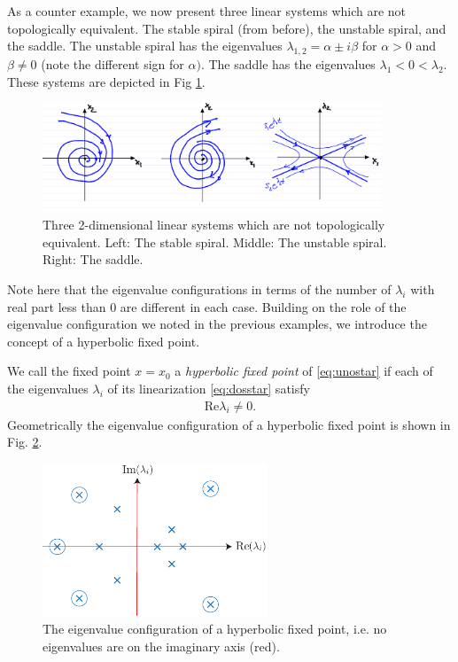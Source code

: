 \begin{ex}[Topologically inequivalent linear systems for $n=2$]
	As a counter example, we now present three linear systems which are not topologically equivalent. The stable spiral (from before), the unstable spiral, and the saddle. The unstable spiral has the eigenvalues $\lambda _{1,2}= \alpha \pm i \beta $ for $\alpha > 0$ and $\beta \neq 0$ (note the different sign for $\alpha)$. The saddle has the eigenvalues $\lambda _1 < 0 < \lambda_2$. These systems are depicted in Fig \ref{fig:topo_inequiv}.
	\begin{figure}[h!]
		\centering
		\includegraphics[width=0.9\textwidth]{figures/ch2/14topo_inequiv.png}
		\caption{Three 2-dimensional linear systems which are not topologically equivalent. Left: The stable spiral. Middle: The unstable spiral. Right: The saddle.}
		\label{fig:topo_inequiv}
	\end{figure}

	Note here that the eigenvalue configurations in terms of the number of $\lambda _i$ with real part less than $0$ are different in each case.
Building on the role of the eigenvalue configuration we noted in the previous examples, we introduce the concept of a hyperbolic fixed point.
\end{ex}
\begin{definition}
	We call the fixed point  ${x} ={x_0} $ a \emph{hyperbolic fixed point} of \eqref{eq:unostar} if each of the eigenvalues $\lambda_i$ of its linearization \eqref{eq:dosstar} satisfy
	\begin{align}
		\boxed{ \textrm{Re} \lambda_i \neq 0.}
	\end{align}
	Geometrically the eigenvalue configuration of a hyperbolic fixed point is shown in Fig. \ref{fig:hyperbol_ex}.
	\begin{figure}[h!]
		\centering
		\includegraphics[width=0.6\textwidth]{figures/ch2/15hyperbol_ex}
		\caption{The eigenvalue configuration of a hyperbolic fixed point, i.e. no eigenvalues are on the imaginary axis (red).}
		\label{fig:hyperbol_ex}
	\end{figure}
\end{definition}
	
